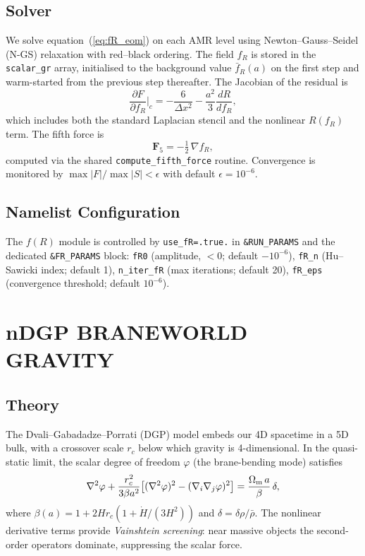 \documentclass[fleqn,usenatbib]{mnras}
\newcommand{\code}[1]{\texttt{#1}}
\newcommand{\Om}{\Omega_{\rm m}}
\newcommand{\fR}{f(R)}
\begin{document}
\subsection{Solver}

We solve equation~(\ref{eq:fR_eom}) on each AMR level using
Newton--Gauss--Seidel (N-GS) relaxation with red--black ordering.
The field $f_R$ is stored in the \code{scalar\_gr} array, initialised
to the background value $\bar{f}_R(a)$ on the first step and
warm-started from the previous step thereafter.  The Jacobian of the
residual is
\begin{equation}
\frac{\partial F}{\partial f_R}\bigg|_c
  = -\frac{6}{\Delta x^2}
    - \frac{a^2}{3}\frac{dR}{df_R},
\end{equation}
which includes both the standard Laplacian stencil and the nonlinear
$R(f_R)$ term.  The fifth force is
\begin{equation}
\mathbf{F}_5 = -\tfrac{1}{2}\,\nabla f_R,
\end{equation}
computed via the shared \code{compute\_fifth\_force} routine.
Convergence is monitored by
$\max|F| / \max|S| < \epsilon$ with default $\epsilon = 10^{-6}$.

\subsection{Namelist Configuration}

The $\fR$ module is controlled by \code{use\_fR=.true.} in
\code{\&RUN\_PARAMS} and the dedicated \code{\&FR\_PARAMS} block:
\code{fR0} (amplitude, $< 0$; default $-10^{-6}$),
\code{fR\_n} (Hu--Sawicki index; default 1),
\code{n\_iter\_fR} (max iterations; default 20),
\code{fR\_eps} (convergence threshold; default $10^{-6}$).


\section{nDGP BRANEWORLD GRAVITY}
\label{sec:nDGP}

\subsection{Theory}

The Dvali--Gabadadze--Porrati (DGP) model \citep{DGP2000} embeds our
4D spacetime in a 5D bulk, with a crossover scale $r_c$ below which
gravity is 4-dimensional.  In the quasi-static limit, the scalar
degree of freedom $\varphi$ (the brane-bending mode) satisfies
\begin{equation}
\nabla^2\varphi + \frac{r_c^2}{3\beta a^2}
\bigl[(\nabla^2\varphi)^2 - (\nabla_i\nabla_j\varphi)^2\bigr]
  = \frac{\Om\,a}{\beta}\,\delta,
\label{eq:nDGP_eom}
\end{equation}
where $\beta(a) = 1 + 2 H r_c (1 + \dot{H}/(3H^2))$ and
$\delta = \delta\rho/\bar\rho$.  The nonlinear derivative terms
provide \emph{Vainshtein screening}: near massive objects the
second-order operators dominate, suppressing the scalar force.
\end{document}
